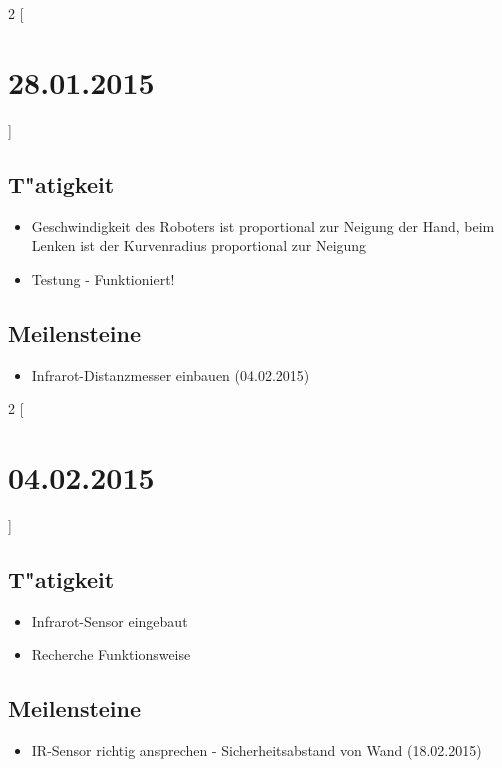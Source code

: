 \documentclass[11pt,a4paper]{article}
\begin{document}
\newpage

\begin{multicols}{2}
[\section*{  28.01.2015  }] 

\subsection*{T"atigkeit}
\begin{itemize}
\item Geschwindigkeit des Roboters ist proportional zur Neigung der Hand, beim Lenken ist der Kurvenradius proportional zur Neigung
\item Testung - Funktioniert!
\end{itemize}

\columnbreak

\subsection*{Meilensteine}

\begin{itemize}
\item Infrarot-Distanzmesser einbauen (04.02.2015)
\end{itemize}

\end{multicols}


\begin{multicols}{2}
[\section*{  04.02.2015  }] 

\subsection*{T"atigkeit}
\begin{itemize}
\item Infrarot-Sensor eingebaut
\item Recherche Funktionsweise
\end{itemize}

\columnbreak

\subsection*{Meilensteine}

\begin{itemize}
\item IR-Sensor richtig ansprechen - Sicherheitsabstand von Wand (18.02.2015)
\end{itemize}

\end{multicols}
\end{document}
